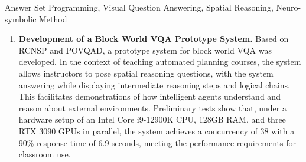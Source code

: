 \begin{englishabstract}{Answer Set Programming, Visual Question Answering, Spatial Reasoning, Neuro-symbolic Method}
\begin{enumerate}[itemsep=0pt]
\item \textbf{Development of a Block World VQA Prototype System.} Based on RCNSP and POVQAD, a prototype system for block world VQA was developed. In the context of teaching automated planning courses, the system allows instructors to pose spatial reasoning questions, with the system answering while displaying intermediate reasoning steps and logical chains. This facilitates demonstrations of how intelligent agents understand and reason about external environments. Preliminary tests show that, under a hardware setup of an Intel Core i9-12900K CPU, 128GB RAM, and three RTX 3090 GPUs in parallel, the system achieves a concurrency of 38 with a 90\% response time of 6.9 seconds, meeting the performance requirements for classroom use.
\end{enumerate}
\end{englishabstract}

\tableofcontents
\listofothers
